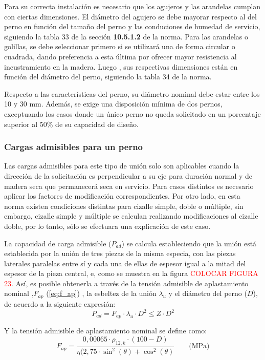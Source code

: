 Para su correcta instalación es necesario que los agujeros y las arandelas cumplan con ciertas dimensiones. El diámetro del agujero se debe mayorar respecto al del perno en función del tamaño del perno y las conduciones de humedad de servicio, siguiendo la tabla 33 de la sección \textbf{10.5.1.2} de la norma. Para las arandelas o golillas, se debe seleccionar primero si se utilizará una de forma circular o cuadrada, dando preferencia a esta última por ofrecer mayor resistencia al incustramiento en la madera. Luego , sus respectivas dimensiones están en función del diámetro del perno, siguiendo la tabla 34 de la norma.

Respecto a las características del perno, su diámetro nominal debe estar entre los 10 y 30 mm. Además, se exige una disposición mínima de dos pernos, exceptuando los casos donde un único perno no queda solicitado en un porcentaje superior al 50\% de su capacidad de diseño.

\subsubsection{Cargas admisibles para un perno}
Las cargas admisibles para este tipo de unión solo son aplicables cuando la dirección de la solicitación es perpendicular a su eje para duración normal y de madera seca que permanecerá seca en servicio. Para casos distintos es necesario aplicar los factores de modificación correspondientes. Por otro lado, en esta norma existen condiciones distintas para cizalle simple, doble o múltiple, sin embargo, cizalle simple y múltiple se calculan realizando modificaciones al cizalle doble, por lo tanto, sólo se efectuara una explicación de este caso.

La capacidad de carga admisible ($P_{ad}$) se calcula estableciendo que la unión está establecida por la unión de tres piezas de la misma especia, con las piezas laterales paralelas entre sí y cada una de ellas de espesor igual a la mitad del espesor de la pieza central, e, como se muestra en la figura \textcolor{red}{COLOCAR FIGURA 23}. Así, es posible obtenerla a través de la tensión admisible de aplastamiento nominal ,$F_{ap}$ (\ref{eq:f_ap}) , la esbeltez de la unión $\lambda_u$ y el diámetro del perno ($D$), de acuerdo a la siguiente expresión:
\begin{equation} \label{eq:padm_ad}
	P_{ad} = F_{ap} \cdot \lambda_u \cdot D^2 \leq Z \cdot D^2
\end{equation}

Y la tensión admisible de aplastamiento nominal se define como:
\begin{equation}\label{eq:f_ap}
	F_{ap} = \frac{0,00065\cdot \rho_{12,k}\cdot (100 - D)}{\eta (2,75\cdot \sin^2(\theta) + \cos^2(\theta)} \qquad \text{(MPa)}
\end{equation}


